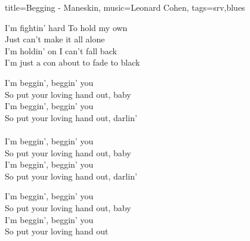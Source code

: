 \begin{song}{title={Begging - Maneskin}, music={Leonard Cohen}, tags={srv,blues}}
\begin{bridge}	
	I'm fightin' hard
To hold my own
\\
	Just can't make it all alone
\\
	I'm holdin' on
I can't fall back
\\
	I'm just a con about to fade to black
\end{bridge}
\begin{chorus}
		I'm beggin', beggin' you
\\
	So put your loving hand out, baby
\\
	I'm beggin', beggin' you
\\
	So put your loving hand out, darlin'\\ \\
		I'm beggin', beggin' you
\\
	So put your loving hand out, baby
\\
	I'm beggin', beggin' you
\\
	So put your loving hand out, darlin'
\end{chorus}
\begin{outro}
	I'm beggin', beggin' you
\\
	So put your loving hand out, baby
\\
	I'm beggin', beggin' you
\\
	So put your loving hand out
\end{outro}
\end{song}
